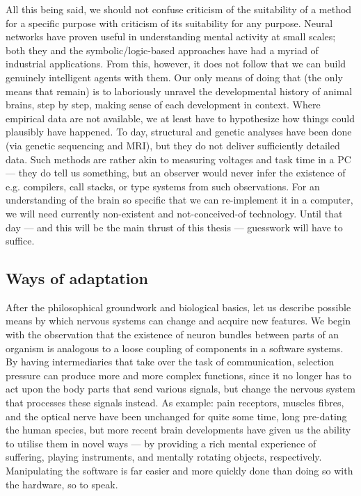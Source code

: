 All this being said, we should not confuse criticism of the suitability of a method for a specific purpose with criticism of its suitability for any purpose. Neural networks have proven useful in understanding mental activity at small scales; both they and the symbolic/logic-based approaches have had a myriad of industrial applications. From this, however, it does not follow that we can build genuinely intelligent agents with them. Our only means of doing that (the only means that remain) is to laboriously unravel the developmental history of animal brains, step by step, making sense of each development in context. Where empirical data are not available, we at least have to hypothesize how things could plausibly have happened. To day, structural and genetic analyses have been done (via genetic sequencing and MRI), but they do not deliver sufficiently detailed data. Such methods are rather akin to measuring voltages and task time in a PC --- they do tell us something, but an observer would never infer the existence of e.g. compilers, call stacks, or type systems from such observations. For an understanding of the brain so specific that we can re-implement it in a computer, we will need currently non-existent and not-conceived-of technology. Until that day --- and this will be the main thrust of this thesis --- guesswork will have to suffice.

\subsection{Ways of adaptation}

After the philosophical groundwork and biological basics, let us describe possible means by which nervous systems can change and acquire new features. We begin with the observation that the existence of neuron bundles between parts of an organism is analogous to a loose coupling of components in a software systems. By having intermediaries that take over the task of communication, selection pressure can produce more and more complex functions, since it no longer has to act upon the body parts that send various signals, but change the nervous system that processes these signals instead. As example: pain receptors, muscles fibres, and the optical nerve have been unchanged for quite some time, long pre-dating the human species, but more recent brain developments have given us the ability to utilise them in novel ways --- by providing a rich mental experience of suffering, playing instruments, and mentally rotating objects, respectively. Manipulating the software is far easier and more quickly done than doing so with the hardware, so to speak.

